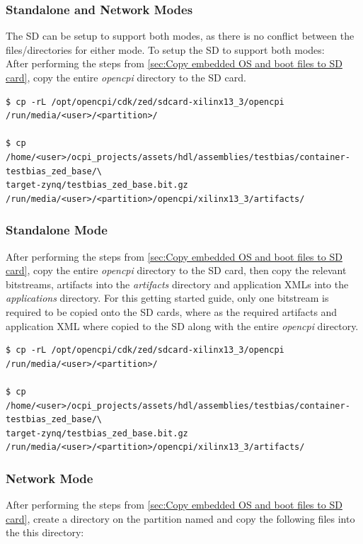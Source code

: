 \subsubsection{Standalone and Network Modes}
The SD can be setup to support both modes, as there is no conflict between the files/directories for either mode. To setup the SD to support both modes:\\

\noindent After performing the steps from \ref{sec:Copy embedded OS and boot files to SD card}, copy the entire \textit{opencpi} directory to the SD card.

\begin{verbatim}
$ cp -rL /opt/opencpi/cdk/zed/sdcard-xilinx13_3/opencpi /run/media/<user>/<partition>/

$ cp /home/<user>/ocpi_projects/assets/hdl/assemblies/testbias/container-testbias_zed_base/\
target-zynq/testbias_zed_base.bit.gz /run/media/<user>/<partition>/opencpi/xilinx13_3/artifacts/
\end{verbatim}

\subsubsection{Standalone Mode}
After performing the steps from \ref{sec:Copy embedded OS and boot files to SD card}, copy the entire \textit{opencpi} directory to the SD card, then copy the relevant bitstreams, artifacts into the \textit{artifacts} directory and application XMLs into the \textit{applications} directory. For this getting started guide, only one bitstream is required to be copied onto the SD cards, where as the required artifacts and application XML where copied to the SD along with the entire \textit{opencpi} directory.

\begin{verbatim}
$ cp -rL /opt/opencpi/cdk/zed/sdcard-xilinx13_3/opencpi /run/media/<user>/<partition>/

$ cp /home/<user>/ocpi_projects/assets/hdl/assemblies/testbias/container-testbias_zed_base/\
target-zynq/testbias_zed_base.bit.gz /run/media/<user>/<partition>/opencpi/xilinx13_3/artifacts/
\end{verbatim}

\subsubsection{Network Mode}
After performing the steps from \ref{sec:Copy embedded OS and boot files to SD card}, create a directory on the partition named  and copy the following files into the this directory:

